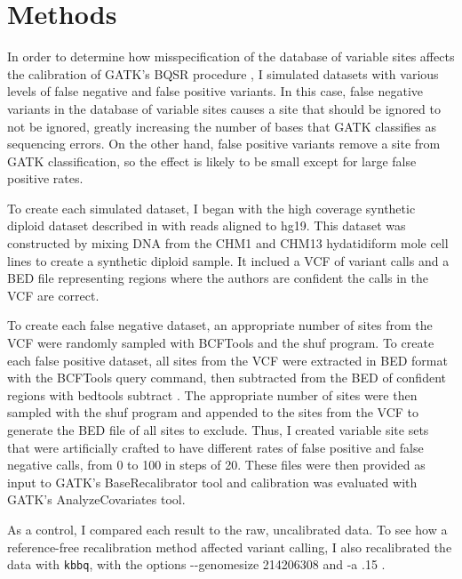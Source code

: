 \section{Methods}

In order to determine how misspecification of the database of variable sites affects the calibration of GATK's BQSR procedure \parencite{auwera_fastq_2013}, I simulated datasets with various levels of false negative and false positive variants. In this case, false negative variants in the database of variable sites causes a site that should be ignored to not be ignored, greatly increasing the number of bases that GATK classifies as sequencing errors. On the other hand, false positive variants remove a site from GATK classification, so the effect is likely to be small except for large false positive rates.

To create each simulated dataset, I began with the high coverage synthetic diploid dataset described in \cite{li_synthetic-diploid_2018} with reads aligned to hg19. This dataset was constructed by mixing DNA from the CHM1 and CHM13 hydatidiform mole cell lines to create a synthetic diploid sample. It inclued a VCF of variant calls and a BED file representing regions where the authors are confident the calls in the VCF are correct.

To create each false negative dataset, an appropriate number of sites from the VCF were randomly sampled with BCFTools and the shuf program. To create each false positive dataset, all sites from the VCF were extracted in BED format with the BCFTools query command, then subtracted from the BED of confident regions with bedtools subtract \parencite{quinlan_bedtools_2010}. The appropriate number of sites were then sampled with the shuf program and appended to the sites from the VCF to generate the BED file of all sites to exclude. Thus, I created variable site sets that were artificially crafted to have different rates of false positive and false negative calls, from 0 to 100 in steps of 20.
These files were then provided as input to GATK's BaseRecalibrator tool and calibration was evaluated with GATK's AnalyzeCovariates tool.

As a control, I compared each result to the raw, uncalibrated data. To see how a reference-free recalibration method affected variant calling, I also recalibrated the data with \texttt{kbbq}, with the options -\phantom{}-genomesize 214206308 and -a .15 .

